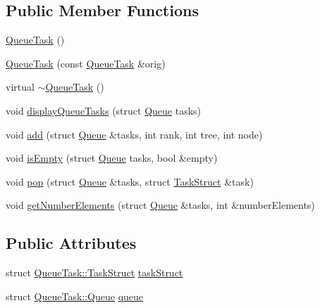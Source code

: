 \subsection*{Public Member Functions}
\begin{DoxyCompactItemize}
\item 
\hyperlink{classQueueTask_aa9b9477fcb1242fc8b357b3f7416752c}{Queue\+Task} ()
\item 
\hyperlink{classQueueTask_a326a20304f894ef5cec9e0a275496ce7}{Queue\+Task} (const \hyperlink{classQueueTask}{Queue\+Task} \&orig)
\item 
virtual \hyperlink{classQueueTask_a9ed7eebd0806d5de8b977c7e8d40dee7}{$\sim$\+Queue\+Task} ()
\item 
void \hyperlink{classQueueTask_a37f73c5339ef2c9d1266430b8f741999}{display\+Queue\+Tasks} (struct \hyperlink{structQueueTask_1_1Queue}{Queue} tasks)
\item 
void \hyperlink{classQueueTask_a5cb3f2197e8ca06187ca3c3afcc95e2b}{add} (struct \hyperlink{structQueueTask_1_1Queue}{Queue} \&tasks, int rank, int tree, int node)
\item 
void \hyperlink{classQueueTask_a32187b71e7fc4b94c029bfa3183440a6}{is\+Empty} (struct \hyperlink{structQueueTask_1_1Queue}{Queue} tasks, bool \&empty)
\item 
void \hyperlink{classQueueTask_a95870b68177d6b6cdd36cec23f80811c}{pop} (struct \hyperlink{structQueueTask_1_1Queue}{Queue} \&tasks, struct \hyperlink{structQueueTask_1_1TaskStruct}{Task\+Struct} \&task)
\item 
void \hyperlink{classQueueTask_a798f3e860e39a4c9ce4aaa3bca64b63f}{get\+Number\+Elements} (struct \hyperlink{structQueueTask_1_1Queue}{Queue} \&tasks, int \&number\+Elements)
\end{DoxyCompactItemize}
\subsection*{Public Attributes}
\begin{DoxyCompactItemize}
\item 
struct \hyperlink{structQueueTask_1_1TaskStruct}{Queue\+Task\+::\+Task\+Struct} \hyperlink{classQueueTask_aa62b59622aa85704f0adedfd9a56ece2}{task\+Struct}
\item 
struct \hyperlink{structQueueTask_1_1Queue}{Queue\+Task\+::\+Queue} \hyperlink{classQueueTask_a5dcac92fbafbc338f87bcf5f2b5b2919}{queue}
\end{DoxyCompactItemize}
